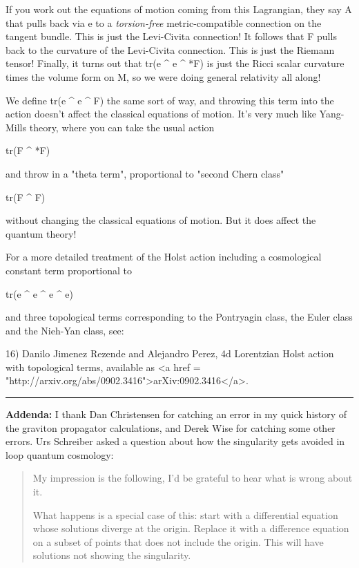 If you work out the equations of motion coming from this Lagrangian,
they say A that pulls back via e to a \emph{torsion-free}
metric-compatible connection on the tangent bundle.  This is just the
Levi-Civita connection!  It follows that F pulls back to the curvature
of the Levi-Civita connection.  This is just the Riemann tensor!
Finally, it turns out that tr(e ^ e ^ *F) is just the Ricci scalar
curvature times the volume form on M, so we were doing general
relativity all along!

We define tr(e ^ e ^ F) the same sort of way, and throwing this term
into the action doesn't affect the classical equations of motion.
It's very much like Yang-Mills theory, where you can take the usual
action

tr(F ^ *F)

and throw in a "theta term", proportional to
"second Chern class"

tr(F ^ F)

without changing the classical equations of motion.  But it does
affect the quantum theory!  

For a more detailed treatment of the Holst action including 
a cosmological constant term proportional to

tr(e ^ e ^ e ^ e)

and three topological terms corresponding to the Pontryagin 
class, the Euler class and the Nieh-Yan class, see:

16) Danilo Jimenez Rezende and Alejandro Perez, 
4d Lorentzian Holst action with topological terms, 
available as <a href = "http://arxiv.org/abs/0902.3416">arXiv:0902.3416</a>.

\par\noindent\rule{\textwidth}{0.4pt}

\textbf{Addenda:} I thank Dan Christensen for catching an error
in my quick history of the graviton propagator calculations, and
Derek Wise for catching some other errors.  
Urs Schreiber asked a question about how the singularity gets
avoided in loop quantum cosmology:

\begin{quote}

My impression is the following, I'd be grateful to hear what is wrong
about it.

What happens is a special case of this: start with a differential
equation whose solutions diverge at the origin. Replace it with a
difference equation on a subset of points that does not include the
origin. This will have solutions not showing the singularity.
\end{quote}

